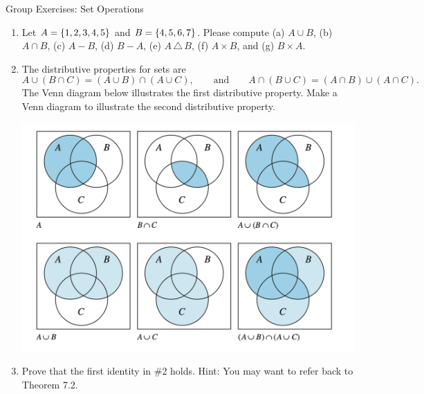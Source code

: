 \documentclass[10pt]{beamer}
\begin{document}
\begin{frame}{Group Exercises: Set Operations}

\footnotesize 
\begin{enumerate}
	\item Let $A=\{ {1,2,3,4,5} \}$ and $B=\{ {4,5,6,7} \}$. Please compute (a) $A \cup B$, (b) $A \cap B$, (c) $A - B$, (d) $B-A$, (e) $A \, \triangle \, B$, (f) $A \times B$, and (g)  $B \times A$.
    \item The distributive properties for sets are 
    \[ A \cup (B \cap C) = (A \cup B) \cap (A \cup C), \qquad \text{and} \qquad  A \cap (B \cup C) = (A \cap B) \cup (A \cap C). \]
    The Venn diagram below illustrates the first distributive property. Make a Venn diagram to illustrate the second distributive property.
    \begin{center}
    \includegraphics[width=.6\textwidth]{images/set_distributive_property}
    \end{center} 
    \item Prove that the first identity in \#2 holds.  Hint: You may want to refer back to Theorem 7.2.
\end{enumerate}
\end{frame}
\end{document}

